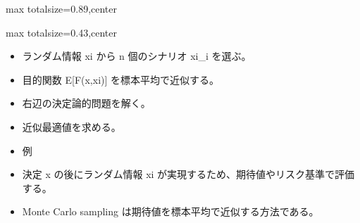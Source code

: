 \begin{minipage}[t]{0.58\textwidth}
\begin{adjustbox}{max totalsize={\textwidth}{0.89\textheight},center}
\begin{minipage}{\textwidth}
\end{minipage}
\end{adjustbox}
\end{minipage}


\clearpage
{}
\begin{minipage}[t]{0.405\textwidth}
\begin{adjustbox}{max totalsize={\textwidth}{0.43\textheight},center}
\begin{minipage}{\textwidth}\scriptsize
{}\begin{itemize}
\item ランダム情報 xi から n 個のシナリオ xi\_i を選ぶ。
\item 目的関数 E[F(x,xi)] を標本平均で近似する。
\item 右辺の決定論的問題を解く。
\item 近似最適値を求める。
\item 例
\end{itemize}\begin{itemize}
\item 決定 x の後にランダム情報 xi が実現するため、期待値やリスク基準で評価する。
\item Monte Carlo sampling は期待値を標本平均で近似する方法である。
\end{itemize}
\end{minipage}
\end{adjustbox}
\end{minipage}\hfill

